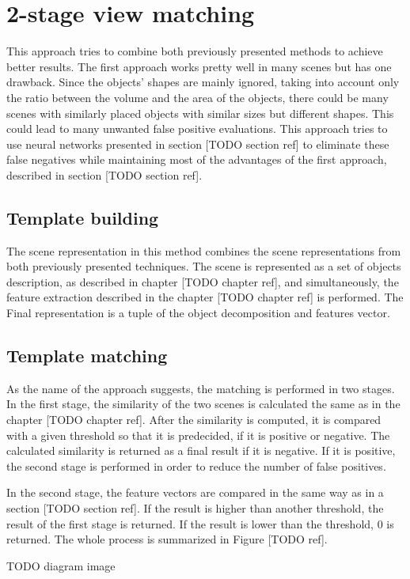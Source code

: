 \section{2-stage view matching}\label{section:2stage}

This approach tries to combine both previously presented methods to achieve better results. The first approach works pretty well in many scenes but has one drawback. Since the objects' shapes are mainly ignored, taking into account only the ratio between the volume and the area of the objects, there could be many scenes with similarly placed objects with similar sizes but different shapes. This could lead to many unwanted false positive evaluations. This approach tries to use neural networks presented in section [TODO section ref] to eliminate these false negatives while maintaining most of the advantages of the first approach, described in section [TODO section ref].\par

\subsection{Template building}

The scene representation in this method combines the scene representations from both previously presented techniques. The scene is represented as a set of objects description, as described in chapter [TODO chapter ref], and simultaneously, the feature extraction described in the chapter [TODO chapter ref] is performed. The Final representation is a tuple of the object decomposition and features vector.

\subsection{Template matching}

As the name of the approach suggests, the matching is performed in two stages. In the first stage, the similarity of the two scenes is calculated the same as in the chapter [TODO chapter ref]. After the similarity is computed, it is compared with a given threshold so that it is predecided, if it is positive or negative. The calculated similarity is returned as a final result if it is negative. If it is positive, the second stage is performed in order to reduce the number of false positives.\par
In the second stage, the feature vectors are compared in the same way as in a section [TODO section ref]. If the result is higher than another threshold, the result of the first stage is returned. If the result is lower than the threshold, 0 is returned. The whole process is summarized in Figure [TODO ref].

TODO diagram image
